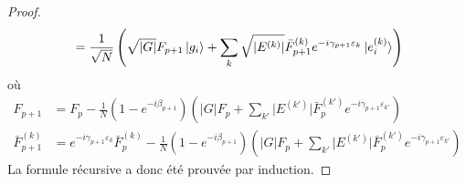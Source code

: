 \begin{proof}
\begin{equation}
\begin{aligned}
&= \frac{1}{\sqrt{ N }} \left( \sqrt{ \lvert G \rvert  } F_{p+1} \ket{g_{i}} + \sum_{k} \sqrt{ \lvert E^{(k)} \rvert  } \bar{F}^{(k)}_{p+1} e^{-i \gamma_{p+1} \varepsilon_{k}} \ket{e^{(k)}_{i}} \right) \\
\end{aligned}
\end{equation}
où
\begin{equation}
\begin{aligned}
F_{p+1} &= F_{p} - \frac{1}{N} (1-e^{-i\beta_{p+1}}) \left( \lvert G \rvert   F_{p} + \sum_{k'} \lvert E^{(k')} \rvert \bar{F}^{(k')}_{p} e^{-i\gamma_{p+1}\varepsilon_{k'}} \right) \\
\bar{F}^{(k)}_{p+1} &= e^{-i\gamma_{p+1} \varepsilon_{k}}\bar{F}_{p}^{(k)} - \frac{1}{N} (1-e^{-i\beta_{p+1}}) \left( \lvert G \rvert   F_{p} + \sum_{k'} \lvert E^{(k')} \rvert \bar{F}^{(k')}_{p} e^{-i\gamma_{p+1}\varepsilon_{k'}} \right)
\end{aligned}
\end{equation}  
La formule récursive a donc été prouvée par induction.
\end{proof}

